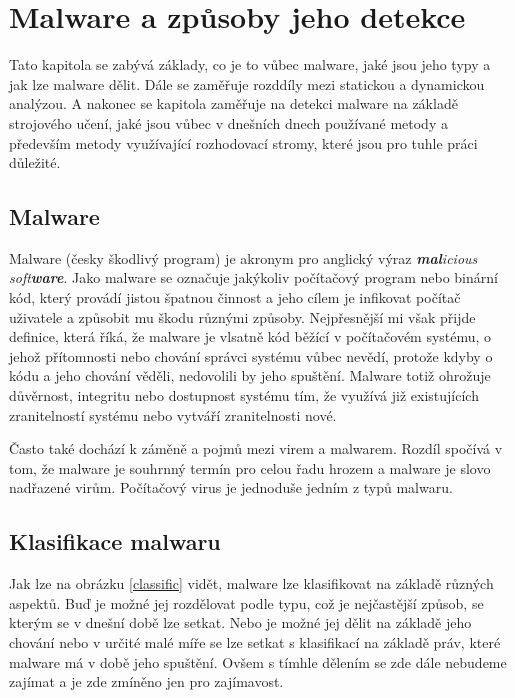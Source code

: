 \chapter{Malware a způsoby jeho detekce} \label{2.chap}

Tato kapitola se zabývá základy, co je to vůbec malware, jaké jsou jeho typy a jak lze malware dělit. Dále se zaměřuje rozddíly mezi statickou a dynamickou analýzou. A nakonec se kapitola zaměřuje na detekci malware na základě strojového učení, 
jaké jsou vůbec v dnešních dnech používané metody a především metody využívající rozhodovací stromy, které jsou pro tuhle práci důležité.

\section{Malware}
Malware (česky škodlivý program) je akronym pro anglický výraz \textit{\textbf{mal}icious soft\textbf{ware}}. Jako malware se označuje jakýkoliv počítačový program nebo binární kód, který provádí jistou 
špatnou činnost a jeho cílem je infikovat počítač uživatele a způsobit mu škodu různými způsoby. %
Nejpřesnější mi však přijde definice, která říká, že malware je vlsatně kód běžící v počítačovém systému, o jehož přítomnosti nebo chování správci systému vůbec nevědí, protože kdyby o kódu a jeho chování věděli, nedovolili by jeho spuštění.
Malware totiž ohrožuje důvěrnost, integritu nebo dostupnost systému tím, že využívá již existujících zranitelností systému nebo vytváří zranitelnosti nové.%

Často také dochází k záměně a pojmů mezi virem a malwarem. Rozdíl spočívá v tom, že malware je souhrnný termín pro celou řadu hrozem a malware je slovo nadřazené virům. Počítačový virus je jednoduše jedním z typů malwaru.

\section{Klasifikace malwaru}
Jak lze na obrázku \ref{classific} vidět, malware lze klasifikovat na základě různých aspektů. Buď je možné jej rozdělovat podle typu, což je nejčastější způsob, se kterým se v dnešní době lze setkat. Nebo je možné 
jej dělit na základě jeho chování nebo v určité malé míře se lze setkat s klasifikací na základě práv, které malware má v době jeho spuštění. Ovšem s tímhle dělením se zde dále nebudeme zajímat a je zde zmíněno jen pro zajímavost.

